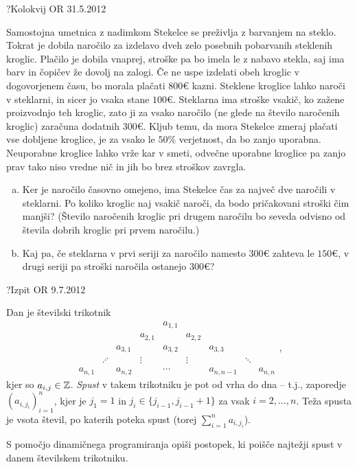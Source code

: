 \begin{naloga}{?}{Kolokvij OR 31.5.2012}
\begin{vprasanje}
Samostojna umetnica z nadimkom Stekelce se preživlja z barvanjem na steklo.
Tokrat je dobila naročilo
za izdelavo dveh zelo posebnih pobarvanih steklenih kroglic.
Plačilo je dobila vnaprej, stroške pa bo imela le z nabavo stekla,
saj ima barv in čopičev že dovolj na zalogi.
Če ne uspe izdelati obeh kroglic v dogovorjenem času,
bo morala plačati $800 €$ kazni.
Steklene kroglice lahko naroči v steklarni, in sicer jo vsaka stane $100 €$.
Steklarna ima stroške vsakič, ko zažene proizvodnjo teh kroglic,
zato ji za vsako naročilo (ne glede na število naročenih kroglic)
zaračuna dodatnih $300 €$.
Kljub temu, da mora Stekelce zmeraj plačati vse dobljene kroglice,
je za vsako le $50 \%$ verjetnost, da bo zanjo uporabna.
Neuporabne kroglice lahko vrže kar v smeti,
odvečne uporabne kroglice pa zanjo prav tako niso vredne nič
in jih bo brez stroškov zavrgla.
\begin{enumerate}[(a)]
\item Ker je naročilo časovno omejeno,
ima Stekelce čas za največ dve naročili v steklarni.
Po koliko kroglic naj vsakič naroči, da bodo pričakovani stroški čim manjši?
(Število naročenih kroglic pri drugem naročilu
bo seveda odvisno od števila dobrih kroglic pri prvem naročilu.)

\item Kaj pa,
če steklarna v prvi seriji za naročilo namesto $300 €$ zahteva le $150 €$,
v drugi seriji pa stroški naročila ostanejo $300 €$?
\end{enumerate}
\end{vprasanje}
\begin{odgovor}
\end{odgovor}
\end{naloga}


\begin{naloga}{?}{Izpit OR 9.7.2012}
\begin{vprasanje}
Dan je številski trikotnik
$$
\begin{array}{ccccccccc}
                &&&& a_{1,1} \\
            &&& a_{2,1} && a_{2,2} \\
        && a_{3,1} && a_{3,2} && a_{3,3} \\
     & \iddots && \vdots && \vdots && \ddots \\
a_{n,1} && a_{n,2} && \cdots && a_{n,n-1} && a_{n,n}
\end{array} ,
$$
kjer so $a_{i,j} \in \mathbb{Z}$.
{\em Spust} v takem trikotniku je pot od vrha do dna
-- t.j., zaporedje $(a_{i, j_i})_{i=1}^n$,
kjer je $j_1 = 1$ in $j_i \in \{j_{i-1}, j_{i-1}+1\}$
za vsak $i = 2, \dots, n$.
Teža spusta je vsota števil, po katerih poteka spust
(torej $\sum_{i=1}^n a_{i, j_i}$).

S pomočjo dinamičnega programiranja opiši postopek,
ki poišče najtežji spust v danem številskem trikotniku.
\end{vprasanje}
\begin{odgovor}
\end{odgovor}
\end{naloga}


